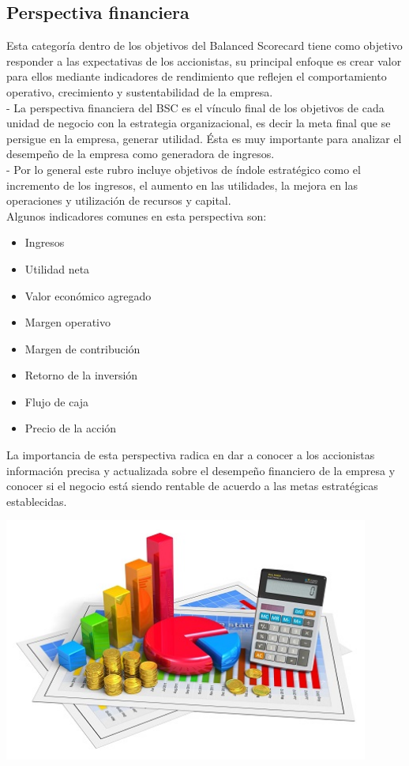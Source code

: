 \subsection{Perspectiva financiera}

Esta categoría dentro de los objetivos del Balanced Scorecard tiene como objetivo responder a las expectativas de los accionistas, su principal enfoque es crear valor para ellos mediante indicadores de rendimiento que reflejen el comportamiento operativo, crecimiento y sustentabilidad de la empresa.\\
-
La perspectiva financiera del BSC es el vínculo final de los objetivos de cada unidad de negocio con la estrategia organizacional, es decir la meta final que se persigue en la empresa, generar utilidad. Ésta es muy importante para analizar el desempeño de la empresa como generadora de ingresos.\\
-
Por lo general este rubro incluye objetivos de índole estratégico como el incremento de los ingresos, el aumento en las utilidades, la mejora en las operaciones y utilización de recursos y capital.\\

Algunos indicadores comunes en esta perspectiva son:
\begin{itemize}
	\item Ingresos
	\item Utilidad neta
	\item Valor económico agregado
	\item Margen operativo
	\item Margen de contribución
	\item Retorno de la inversión
	\item Flujo de caja
	\item Precio de la acción
\end{itemize}
La importancia de esta perspectiva radica en dar a conocer a los accionistas información precisa y actualizada sobre el desempeño financiero de la empresa y conocer si el negocio está siendo rentable de acuerdo a las metas estratégicas establecidas.\\

\begin{center}
	\includegraphics[width=12cm]{./Imagenes/imagen2} 
\end{center}

